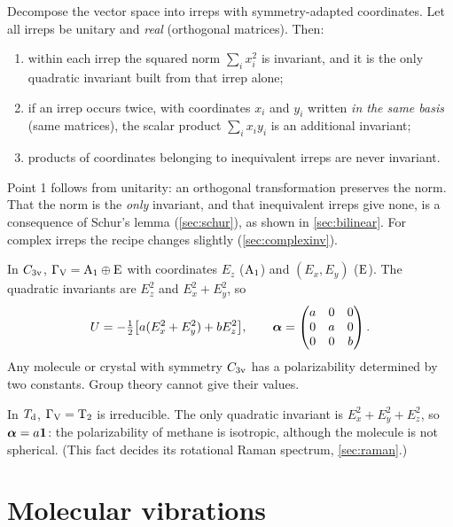 \begin{keyresult}
Decompose the vector space into irreps with symmetry-adapted coordinates.
Let all irreps be unitary and \emph{real} (orthogonal matrices). Then:
\begin{enumerate}
\item within each irrep the squared norm $\sum_i x_i^2$ is invariant, and it is the
      only quadratic invariant built from that irrep alone;
\item if an irrep occurs twice, with coordinates $x_i$ and $y_i$ written \emph{in the
      same basis} (same matrices), the scalar product $\sum_i x_iy_i$ is an additional
      invariant;
\item products of coordinates belonging to inequivalent irreps are never invariant.
\end{enumerate}
\end{keyresult}
Point 1 follows from unitarity: an orthogonal transformation preserves the norm.
That the norm is the \emph{only} invariant, and that inequivalent irreps give none,
is a consequence of Schur's lemma (\cref{sec:schur}), as shown in \cref{sec:bilinear}.
For complex irreps the recipe changes slightly (\cref{sec:complexinv}).

\begin{example}
In $C_{3\mathrm{v}}$, $\Gamma_{\mathrm{V}}=\mathrm{A}_1\oplus\mathrm{E}$ with coordinates $E_z$ ($\mathrm{A}_1$) and
$(E_x,E_y)$ ($\mathrm{E}$). The quadratic invariants are $E_z^2$ and $E_x^2+E_y^2$, so
\[
U=-\tfrac12\bigl[a(E_x^2+E_y^2)+bE_z^2\bigr],\qquad
\bm{\alpha}=\begin{pmatrix}a&0&0\\0&a&0\\0&0&b\end{pmatrix}.
\]
Any molecule or crystal with symmetry $C_{3\mathrm{v}}$ has a polarizability determined by two
constants. Group theory cannot give their values.
\end{example}

\begin{example}
In $T_{\mathrm{d}}$, $\Gamma_{\mathrm{V}}=\mathrm{T}_2$ is irreducible. The only quadratic invariant is
$E_x^2+E_y^2+E_z^2$, so $\bm{\alpha}=a\bm{1}$: the polarizability of methane is
isotropic, although the molecule is not spherical. (This fact decides its rotational
Raman spectrum, \cref{sec:raman}.)
\end{example}

\section{Molecular vibrations}\label{sec:vibrations}

